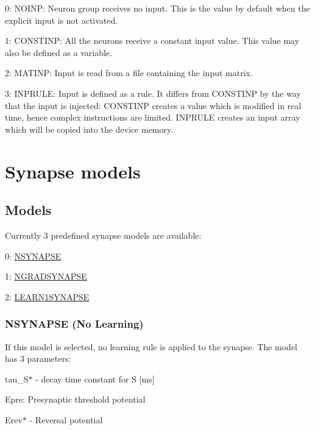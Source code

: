 \begin{DoxyItemize}
\item 0\+: N\+O\+I\+N\+P\+: Neuron group receives no input. This is the value by default when the explicit input is not activated.
\item 1\+: C\+O\+N\+S\+T\+I\+N\+P\+: All the neurons receive a constant input value. This value may also be defined as a variable.
\item 2\+: M\+A\+T\+I\+N\+P\+: Input is read from a file containing the input matrix.
\item 3\+: I\+N\+P\+R\+U\+L\+E\+: Input is defined as a rule. It differs from C\+O\+N\+S\+T\+I\+N\+P by the way that the input is injected\+: C\+O\+N\+S\+T\+I\+N\+P creates a value which is modified in real time, hence complex instructions are limited. I\+N\+P\+R\+U\+L\+E creates an input array which will be copied into the device memory.
\end{DoxyItemize}\hypertarget{UserManual_sec_sect3}{}\section{Synapse models}\label{UserManual_sec_sect3}
\hypertarget{UserManual_sec_subsect31}{}\subsection{Models}\label{UserManual_sec_subsect31}
Currently 3 predefined synapse models are available\+:
\begin{DoxyItemize}
\item 0\+: \hyperlink{UserManual_sec_sect31}{N\+S\+Y\+N\+A\+P\+S\+E}
\item 1\+: \hyperlink{UserManual_sec_sect32}{N\+G\+R\+A\+D\+S\+Y\+N\+A\+P\+S\+E}
\item 2\+: \hyperlink{UserManual_sec_sect33}{L\+E\+A\+R\+N1\+S\+Y\+N\+A\+P\+S\+E}
\end{DoxyItemize}\hypertarget{UserManual_sec_sect31}{}\subsubsection{N\+S\+Y\+N\+A\+P\+S\+E (\+No Learning)}\label{UserManual_sec_sect31}
If this model is selected, no learning rule is applied to the synapse. The model has 3 parameters\+:
\begin{DoxyItemize}
\item {\ttfamily tau\+\_\+\+S$\ast$} -\/ decay time constant for S \mbox{[}ms\mbox{]}
\item {\ttfamily Epre\+:} Presynaptic threshold potential
\item {\ttfamily Erev$\ast$} -\/ Reversal potential
\end{DoxyItemize}

